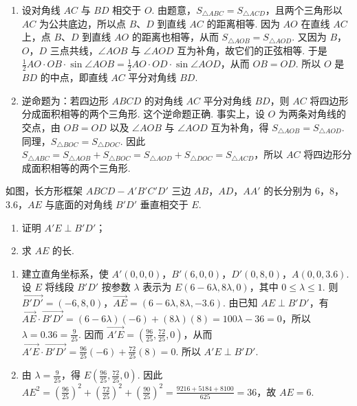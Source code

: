 \begin{solution}
\begin{enumerate}
\item 设对角线 \(AC\) 与 \(BD\) 相交于 \(O\). 由题意，\(S_{\triangle ABC}=S_{\triangle ACD}\)，且两个三角形以 \(AC\) 为公共底边，所以点 \(B\)、\(D\) 到直线 \(AC\) 的距离相等. 因为 \(AO\) 在直线 \(AC\) 上，点 \(B\)、\(D\) 到直线 \(AO\) 的距离也相等，从而 \(S_{\triangle AOB}=S_{\triangle AOD}\). 又因为 \(B\)，\(O\)，\(D\) 三点共线，\(\angle AOB\) 与 \(\angle AOD\) 互为补角，故它们的正弦相等. 于是 \(\frac12 AO\cdot OB\cdot\sin\angle AOB=\frac12 AO\cdot OD\cdot\sin\angle AOD\)，从而 \(OB=OD\). 所以 \(O\) 是 \(BD\) 的中点，即直线 \(AC\) 平分对角线 \(BD\).
\item 逆命题为：若四边形 \(ABCD\) 的对角线 \(AC\) 平分对角线 \(BD\)，则 \(AC\) 将四边形分成面积相等的两个三角形. 这个逆命题正确. 事实上，设 \(O\) 为两条对角线的交点，由 \(OB=OD\) 以及 \(\angle AOB\) 与 \(\angle AOD\) 互为补角，得 \(S_{\triangle AOB}=S_{\triangle AOD}\). 同理，\(S_{\triangle BOC}=S_{\triangle DOC}\). 因此 \(S_{\triangle ABC}=S_{\triangle AOB}+S_{\triangle BOC}=S_{\triangle AOD}+S_{\triangle DOC}=S_{\triangle ACD}\)，所以 \(AC\) 将四边形分成面积相等的两个三角形.
\end{enumerate}
\end{solution}

\begin{problem}
如图，长方形框架 \(ABCD-A'B'C'D'\) 三边 \(AB\)，\(AD\)，\(AA'\) 的长分别为 \(6\)，\(8\)，\(3.6\)，\(AE\) 与底面的对角线 \(B'D'\) 垂直相交于 \(E\).

\begin{enumerate}
\item 证明 \(A'E\perp B'D'\)；
\item 求 \(AE\) 的长.
\end{enumerate}

\end{problem}

\begin{solution}
\begin{enumerate}
\item 建立直角坐标系，使 \(A'(0,0,0)\)，\(B'(6,0,0)\)，\(D'(0,8,0)\)，\(A(0,0,3.6)\). 设 \(E\) 将线段 \(B'D'\) 按参数 \(\lambda\) 表示为 \(E(6-6\lambda,8\lambda,0)\)，其中 \(0\leqslant\lambda\leqslant1\). 则 \(\overrightarrow{B'D'}=(-6,8,0)\)，\(\overrightarrow{AE}=(6-6\lambda,8\lambda,-3.6)\). 由已知 \(AE\perp B'D'\)，有 \(\overrightarrow{AE}\cdot\overrightarrow{B'D'}=(6-6\lambda)(-6)+(8\lambda)(8)=100\lambda-36=0\)，所以 \(\lambda=0.36=\frac{9}{25}\). 因而 \(\overrightarrow{A'E}=\left(\frac{96}{25},\frac{72}{25},0\right)\)，从而 \(\overrightarrow{A'E}\cdot\overrightarrow{B'D'}=\frac{96}{25}(-6)+\frac{72}{25}(8)=0\). 所以 \(A'E\perp B'D'\).
\item 由 \(\lambda=\frac{9}{25}\)，得 \(E\left(\frac{96}{25},\frac{72}{25},0\right)\). 因此 \(AE^2=\left(\frac{96}{25}\right)^2+\left(\frac{72}{25}\right)^2+\left(\frac{90}{25}\right)^2=\frac{9216+5184+8100}{625}=36\)，故 \(AE=6\).
\end{enumerate}
\end{solution}

